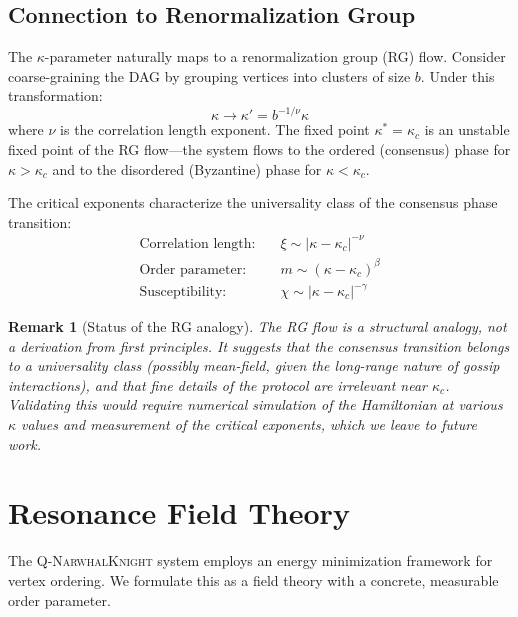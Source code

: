 \documentclass[12pt,a4paper,twocolumn]{article}
\newtheorem{remark}{Remark}
\newcommand{\qnk}{\textsc{Q-NarwhalKnight}}
\newcommand{\kparam}{\kappa}
\begin{document}
\subsection{Connection to Renormalization Group}

The $\kparam$-parameter naturally maps to a renormalization group (RG) flow. Consider coarse-graining the DAG by grouping vertices into clusters of size $b$. Under this transformation:
\begin{equation}
\kparam \to \kparam' = b^{-1/\nu} \kparam
\end{equation}
where $\nu$ is the correlation length exponent. The fixed point $\kparam^* = \kparam_c$ is an unstable fixed point of the RG flow---the system flows to the ordered (consensus) phase for $\kparam > \kparam_c$ and to the disordered (Byzantine) phase for $\kparam < \kparam_c$.

The critical exponents characterize the universality class of the consensus phase transition:
\begin{align}
\text{Correlation length:}& \quad \xi \sim |\kparam - \kparam_c|^{-\nu} \\
\text{Order parameter:}& \quad m \sim (\kparam - \kparam_c)^\beta \\
\text{Susceptibility:}& \quad \chi \sim |\kparam - \kparam_c|^{-\gamma}
\end{align}

\begin{remark}[Status of the RG analogy]
The RG flow is a structural analogy, not a derivation from first principles. It suggests that the consensus transition belongs to a universality class (possibly mean-field, given the long-range nature of gossip interactions), and that fine details of the protocol are irrelevant near $\kparam_c$. Validating this would require numerical simulation of the Hamiltonian at various $\kparam$ values and measurement of the critical exponents, which we leave to future work.
\end{remark}

\section{Resonance Field Theory}
\label{sec:resonance}

The \qnk{} system employs an energy minimization framework for vertex ordering. We formulate this as a field theory with a concrete, measurable order parameter.
\end{document}
